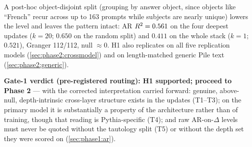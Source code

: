 A post-hoc object-disjoint split (grouping by answer object, since objects
like ``French'' recur across up to 163 prompts while subjects are nearly
unique) lowers the level and leaves the pattern intact: AR $R^2 = 0.561$ on
the four deepest updates ($k{=}20$; $0.650$ on the random split) and $0.411$
on the whole stack ($k{=}1$; $0.521$), Granger 112/112, null $\approx
0$. H1 also replicates on all five replication models
(\cref{sec:phase2:crossmodel}) and on
length-matched generic Pile text (\cref{sec:phase2:generic}).

\textbf{Gate-1 verdict (pre-registered routing): H1 supported; proceed to
Phase 2} --- with the corrected interpretation carried forward: genuine,
above-null, depth-intrinsic cross-layer structure exists in the updates
(T1--T3); on the primary model it is substantially a property of the
architecture rather than of training, though that reading is Pythia-specific
(T4); and raw AR-on-$\Delta$ levels must never be quoted without the tautology
split (T5) or without the depth set they were scored on
(\cref{sec:phase1:ar}).
